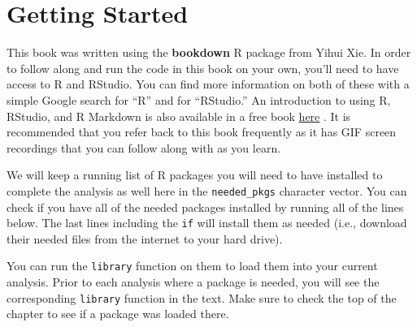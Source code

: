 \documentclass[]{tufte-book}
\newenvironment{Shaded}{\begin{snugshade}}{\end{snugshade}}
\newcommand{\KeywordTok}[1]{\textcolor[rgb]{0.13,0.29,0.53}{\textbf{{#1}}}}
\newcommand{\DataTypeTok}[1]{\textcolor[rgb]{0.13,0.29,0.53}{{#1}}}
\newcommand{\StringTok}[1]{\textcolor[rgb]{0.31,0.60,0.02}{{#1}}}
\newcommand{\NormalTok}[1]{{#1}}
\begin{document}
\section{Getting Started}\label{getting-started}

This book was written using the \textbf{bookdown} R package from Yihui
Xie. In order to follow along and run the code in this book on your own,
you'll need to have access to R and RStudio. You can find more
information on both of these with a simple Google search for ``R'' and
for ``RStudio.'' An introduction to using R, RStudio, and R Markdown is
also available in a free book
\href{http://ismayc.github.io/rbasics-book}{here} \citep{usedtor2016}.
It is recommended that you refer back to this book frequently as it has
GIF screen recordings that you can follow along with as you learn.

We will keep a running list of R packages you will need to have
installed to complete the analysis as well here in the
\texttt{needed\_pkgs} character vector. You can check if you have all of
the needed packages installed by running all of the lines below. The
last lines including the \texttt{if} will install them as needed (i.e.,
download their needed files from the internet to your hard drive).

You can run the \texttt{library} function on them to load them into your
current analysis. Prior to each analysis where a package is needed, you
will see the corresponding \texttt{library} function in the text. Make
sure to check the top of the chapter to see if a package was loaded
there.

\begin{Shaded}
\end{Shaded}
\end{document}
